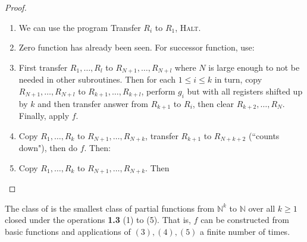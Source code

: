 \documentclass[10pt,a4paper]{article}
\newcommand{\N}{\mathbb{N}}
\let\emph\relax
\begin{document}
\begin{proof}\item
\begin{enumerate}
\item We can use the program Transfer $R_i$ to $R_1$, \textsc{Halt}.
\item Zero function has already been seen. For successor function, use:
\begin{center}
\end{center}
\item First transfer $R_1,\ldots, R_l$ to $R_{N+1},\ldots, R_{N+l}$ where $N$ is large enough to not be needed in other subroutines. Then for each $1\leq i\leq k$ in turn, copy $R_{N+1}, \ldots, R_{N+l}$ to $R_{k+1},\ldots, R_{k+l}$, perform $g_i$ but with all registers shifted up by $k$ and then transfer answer from $R_{k+1}$ to $R_{i}$, then clear $R_{k+2},\ldots,R_N$. Finally, apply $f$. 
\item Copy $R_1,\ldots,R_k$ to $R_{N+1},\ldots,R_{N+k}$, transfer $R_{k+1}$ to $R_{N+k+2}$ (``counts down"), then do $f$. Then:
\begin{center}
\end{center}
\item Copy $R_1, \ldots, R_k$ to $R_{N+1},\ldots,R_{N+k}$. Then
\begin{center}
\end{center}
\end{enumerate}
\end{proof}
The class of \emph{partial recursive functions} is the smallest class of partial functions from $\N^k$ to $\N$ over all $k\geq 1$ closed under the operations \textbf{1.3} (1) to (5). That is, $f$ can be constructed from basic functions and applications of $(3), (4), (5)$ a finite number of times.
\end{document}

